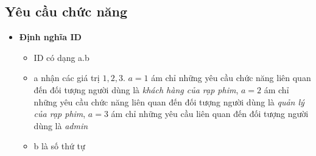 \documentclass[a4paper, 12pt]{article}
\begin{document}
    \subsection{Yêu cầu chức năng}
    \begin{itemize}
        \item \textbf{Định nghĩa ID}
        \begin{itemize}
            \item ID có dạng a.b
            \item a nhận các giá trị $1, 2, 3$. $a = 1$ ám chỉ những yêu cầu chức năng liên quan đến đối tượng người dùng là \textit{khách hàng của rạp phim}, $a = 2$ ám chỉ những yêu cầu chức năng liên quan đến đối tượng người dùng là \textit{quản lý của rạp phim}, $a = 3$ ám chỉ những yêu cầu liên quan đến đối tượng người dùng là \textit{admin}
            \item b là số thứ tự
        \end{itemize}


\end{itemize}
\end{document}
